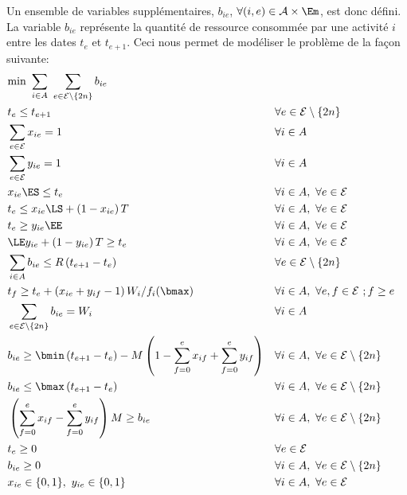 Un ensemble de variables supplémentaires, $b_{ie}$, $\forall (i,e) \in
\A\times \Em$, est donc défini. La variable $b_{ie}$ représente la
quantité de ressource consommée par une activité $i$ entre les dates
$t_e$ et $t_{e+1}$.  Ceci nous permet de modéliser le problème de la
façon suivante:
{\small
\begin{align}
& \text{min } \sum_{i\in A}\ \sum_{e\in \E\setminus\{2n\}} b_{ie} 
\label{obj_CECSP_SE}\\
&t_e \le t_{e+1} & & \forall e \in
\E\setminus\{2n\} \label{ordre_CECSP_SE}\\
 &\sum_{e\in \E} x_{ie} =1 & & \forall i \in
A \label{start_CECSP_SE}\\
 &\sum_{e\in \E} y_{ie} =1 & & \forall i \in A \label{end_CECSP_SE}\\
 &x_{ie}\ES \le t_e & & \forall i \in A,\ \forall e \in
\E \label{twx1_CECSP_SE}\\
 &t_e \le x_{ie}\LS+ \left(1-x_{ie}\right)T & & \forall i \in A,\
\forall e \in \E \label{twx2_CECSP_SE}\\
 &t_e \ge y_{ie}\EE & & \forall i \in A ,\ \forall e \in \E 
 \label{twy1_CECSP_SE}\\
 &\LE y_{ie} + \left(1-y_{ie}\right)T \ge t_e & & \forall i \in A,\ \forall e \in \E 
 \label{twy2_CECSP_SE}\\
 &\sum_{i \in A} b_{ie} \le R \left(t_{e+1}- t_e\right) & & 
 \forall e \in \E\setminus\{2n\} \label{res_CECSP_SE}\\
 &t_f \ge t_e +  \left(x_{ie} + y_{if} -1\right) W_i/f_i(\bmax) & & \forall i \in A,\ 
 \forall e,f \in \E\ ; f\ge e \label{dur_CECSP_SE}\\
 &\sum_{e\in \E\setminus\{2n\}} b_{ie} = W_i  & & \forall i \in A 
 \label{nrj_CECSP_SE}\\
&b_{ie} \ge \bmin \left(t_{e+1}-t_e\right) 
- M \left(1 - \sum_{f=0}^e x_{if} +\sum_{f=0}^e y_{if}\right) 
& &  \forall i \in A,\ \forall e \in \E\setminus\{2n\} \label{bmin_CECSP_SE}\\
&b_{ie} \le \bmax  \left(t_{e+1} - t_e\right) & &
\forall i \in A,\ \forall e \in \E\setminus\{2n\} \label{bmax_CECSP_SE}\\
& \left(\sum_{f=0}^{e} x_{if} - \sum_{f=0}^e y_{if}\right)M\ge b_{ie} & &
 \forall i \in A,\ \forall e \in \E\setminus\{2n\} \label{res0_CECSP_SE}\\
&t_e \ge 0 & & \forall e \in \E \label{eq36}\\
& b_{ie} \ge 0 & & \forall i \in A,\ \forall e \in \E\setminus\{2n\} 
\label{Bb_CECSP_SE}\\
&x_{ie} \in \{0,1\},\ y_{ie} \in \{0,1\} & & 
\forall i \in A,\ \forall e \in \E \label{eq39}
\end{align}
}

